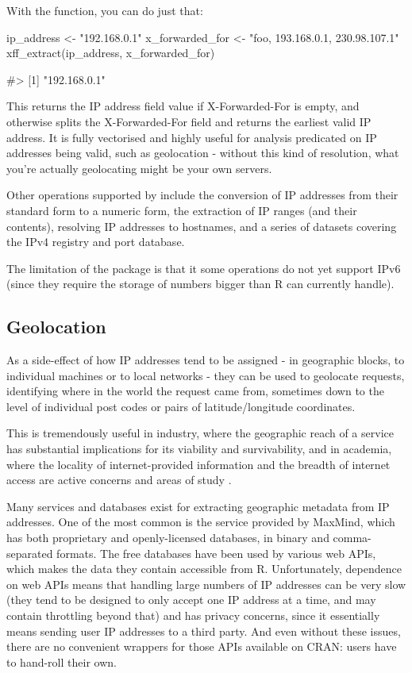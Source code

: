 With the  function, you can do just that:

\begin{Schunk}
\begin{Sinput}
ip_address <- "192.168.0.1"
x_forwarded_for <- "foo, 193.168.0.1, 230.98.107.1"
xff_extract(ip_address, x_forwarded_for)
\end{Sinput}
\begin{Soutput}
#> [1] "192.168.0.1"
\end{Soutput}
\end{Schunk}

This returns the IP address field value if X-Forwarded-For is empty, and
otherwise splits the X-Forwarded-For field and returns the earliest
valid IP address. It is fully vectorised and highly useful for analysis
predicated on IP addresses being valid, such as geolocation - without
this kind of resolution, what you're actually geolocating might be your
own servers.

Other operations supported by  include the conversion of IP
addresses from their standard  form to a numeric
form, the extraction of IP ranges (and their contents), resolving IP
addresses to hostnames, and a series of datasets covering the IPv4
registry and port database.

The limitation of the package is that it some operations do not yet
support IPv6 (since they require the storage of numbers bigger than R
can currently handle).

\subsection{Geolocation}\label{geolocation}

As a side-effect of how IP addresses tend to be assigned - in geographic
blocks, to individual machines or to local networks - they can be used
to geolocate requests, identifying where in the world the request came
from, sometimes down to the level of individual post codes or pairs of
latitude/longitude coordinates.

This is tremendously useful in industry, where the geographic reach of a
service has substantial implications for its viability and
survivability, and in academia, where the locality of internet-provided
information and the breadth of internet access are active concerns and
areas of study \citep{barriers}.

Many services and databases exist for extracting geographic metadata
from IP addresses. One of the most common is the service provided by
MaxMind, which has both proprietary and openly-licensed databases, in
binary and comma-separated formats. The free databases have been used by
various web APIs, which makes the data they contain accessible from R.
Unfortunately, dependence on web APIs means that handling large numbers
of IP addresses can be very slow (they tend to be designed to only
accept one IP address at a time, and may contain throttling beyond that)
and has privacy concerns, since it essentially means sending user IP
addresses to a third party. And even without these issues, there are no
convenient wrappers for those APIs available on CRAN: users have to
hand-roll their own.

